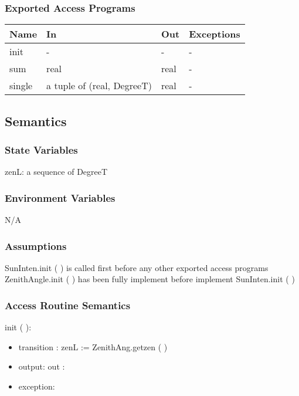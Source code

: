 \documentclass[12pt, titlepage]{article}
\begin{document}
\subsubsection{Exported Access Programs}

\begin{center}
\begin{tabular}{p{2cm} p{5cm} p{3cm} p{2cm}}
\hline
\textbf{Name} & \textbf{In} & \textbf{Out} & \textbf{Exceptions} \\
\hline 
init & - & - & - \\
sum & real & real & - \\
single & a tuple of (real, DegreeT) & real & - \\

\hline
\end{tabular}
\end{center}


\subsection{Semantics}

\subsubsection{State Variables}

zenL: a sequence of DegreeT\\


\subsubsection{Environment Variables}

N/A

\subsubsection{Assumptions}
SunInten.init ( ) is called first before any other exported access programs\\
ZenithAngle.init ( ) has been fully implement before implement SunInten.init ( )\\

\subsubsection{ Access Routine Semantics}

\noindent init (  ):
\begin{itemize}
\item transition : zenL := ZenithAng.getzen ( )
\item output: out :
\item exception: 
\end{itemize}
\end{document}
